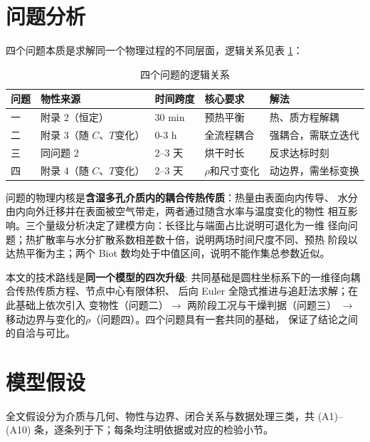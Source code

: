 \documentclass[12pt,a4paper,fontset=none]{ctexart}
\begin{document}
\section{问题分析}

四个问题本质是求解同一个物理过程的不同层面，逻辑关系见表 \ref{tab:overview}：

\begin{table}[htbp]
  \centering
  \caption{四个问题的逻辑关系}
  \label{tab:overview}
  \small
  \begin{tabular}{lllll}
    \toprule
    问题 & 物性来源 & 时间跨度 & 核心要求 & 解法 \\
    \midrule
    一 & 附录 2（恒定）        & 30 min  & 预热平衡 & 热、质方程解耦 \\
    二 & 附录 3（随 $C$、$T$变化） & 0-3 h & 全流程耦合 & 强耦合，需联立迭代 \\
    三 & 同问题 2             & 2--3 天 & 烘干时长 & 反求达标时刻 \\
    四 & 附录 4（随 $C$、$T$变化） & 2--3 天 & $\rho$和尺寸变化 & 动边界，需坐标变换 \\
    \bottomrule
  \end{tabular}
\end{table}

问题的物理内核是\textbf{含湿多孔介质内的耦合传热传质}：热量由表面向内传导、
水分由内向外迁移并在表面被空气带走，两者通过随含水率与温度变化的物性
相互影响。三个量级分析决定了建模方向：长径比与端面占比说明可退化为一维
径向问题；热扩散率与水分扩散系数相差数十倍，说明两场时间尺度不同、预热
阶段以达热平衡为主；两个 Biot 数均处于中值区间，说明不能作集总参数近似。

本文的技术路线是\textbf{同一个模型的四次升级}:
共同基础是圆柱坐标系下的一维径向耦合传热传质方程、节点中心有限体积、
后向 Euler 全隐式推进与追赶法求解；在此基础上依次引入
变物性（问题二）$\to$ 两阶段工况与干燥判据（问题三）
$\to$ 移动边界与变化的$\rho$（问题四）。四个问题具有一套共同的基础，
    保证了结论之间的自洽与可比。

\section{模型假设}

全文假设分为介质与几何、物性与边界、闭合关系与数据处理三类，共
(A1)--(A10) 条，逐条列于下；每条均注明依据或对应的检验小节。
\end{document}

